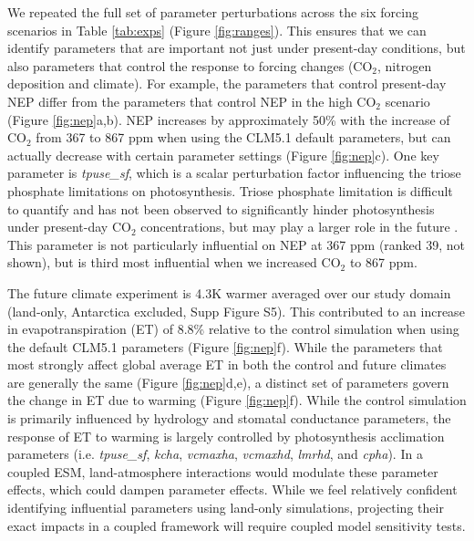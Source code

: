 \documentclass[draft]{agujournal2019}
\begin{document}
We repeated the full set of parameter perturbations across the six forcing scenarios in Table \ref{tab:exps} (Figure \ref{fig:ranges}). This ensures that we can identify parameters that are important not just under present-day conditions, but also parameters that control the response to forcing changes (CO$_2$, nitrogen deposition and climate). For example, the parameters that control present-day NEP differ  from the parameters that control NEP in the high CO$_2$ scenario (Figure \ref{fig:nep}a,b). NEP increases by approximately 50\% with the increase of CO$_2$ from 367 to 867 ppm when using the CLM5.1 default parameters, but can actually decrease with certain parameter settings (Figure \ref{fig:nep}c). One key parameter is \textit{tpuse\_sf}, which is a scalar perturbation factor influencing the triose phosphate limitations on photosynthesis. Triose phosphate limitation is difficult to quantify and has not been observed to significantly hinder photosynthesis under present-day CO$_2$ concentrations, but may play a larger role in the future \cite{lombardozzi2018,kumarathunge2019}. This parameter is not particularly influential on NEP at 367 ppm (ranked 39, not shown), but is third most influential when we increased CO$_2$ to 867 ppm. 

The future climate experiment is 4.3K warmer averaged over our study domain (land-only, Antarctica excluded, Supp Figure S5). This contributed to an increase in evapotranspiration (ET) of 8.8\% relative to the control simulation when using the default CLM5.1 parameters (Figure \ref{fig:nep}f). While the parameters that most strongly affect global average ET in both the control and future climates are generally the same (Figure \ref{fig:nep}d,e), a distinct set of parameters govern the change in ET due to warming (Figure \ref{fig:nep}f). While the control simulation is primarily influenced by hydrology and stomatal conductance parameters, the response of ET to warming is largely controlled by photosynthesis acclimation parameters (i.e. \textit{tpuse\_sf}, \textit{kcha}, \textit{vcmaxha}, \textit{vcmaxhd}, \textit{lmrhd}, and \textit{cpha}). In a coupled ESM, land-atmosphere interactions would modulate these parameter effects, which could dampen parameter effects. While we feel relatively confident identifying influential parameters using land-only simulations, projecting their exact impacts in a coupled framework will require coupled model sensitivity tests.
\end{document}

